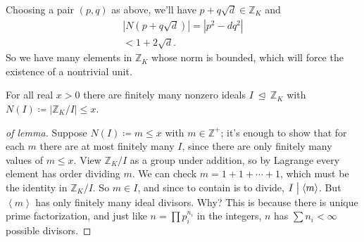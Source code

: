 \begin{remark}

Choosing a pair \((p, q)\) as above, we'll have
\(p + q \sqrt{d} \in {\mathbb{Z}}_K\) and
\begin{align*}
{\left\lvert { N( p + q \sqrt{d} ) } \right\rvert} 
= {\left\lvert { p^2 - d q^2 } \right\rvert} \\
< 1 + 2 \sqrt{d} 
.\end{align*}
So we have many elements in \({\mathbb{Z}}_K\) whose norm is bounded,
which will force the existence of a nontrivial unit.

\end{remark}

\begin{lemma}

For all real \(x> 0\) there are finitely many nonzero ideals
\(I{~\trianglelefteq~}{\mathbb{Z}}_K\) with
\(N(I) \coloneqq{\left\lvert { {\mathbb{Z}}_K/I } \right\rvert} \leq x\).

\end{lemma}

\begin{proof}[of lemma]

Suppose \(N(I) \coloneqq m \leq x\) with \(m \in {\mathbb{Z}}^+\); it's
enough to show that for each \(m\) there are at most finitely many
\(I\), since there are only finitely many values of \(m \leq x\). View
\({\mathbb{Z}}_K / I\) as a group under addition, so by Lagrange every
element has order dividing \(m\). We can check
\(m = 1 + 1 + \cdots + 1\), which must be the identity in
\({\mathbb{Z}}_K/I\). So \(m\in I\), and since to contain is to divide,
\(I \bigm|\left\langle{ m }\right\rangle\). But
\(\left\langle{ m }\right\rangle\) has only finitely many ideal
divisors. Why? This is because there is unique prime factorization, and
just like \(n = \prod p_i^{n_i}\) in the integers, \(n\) has
\(\sum n_i < \infty\) possible divisors.

\end{proof}

